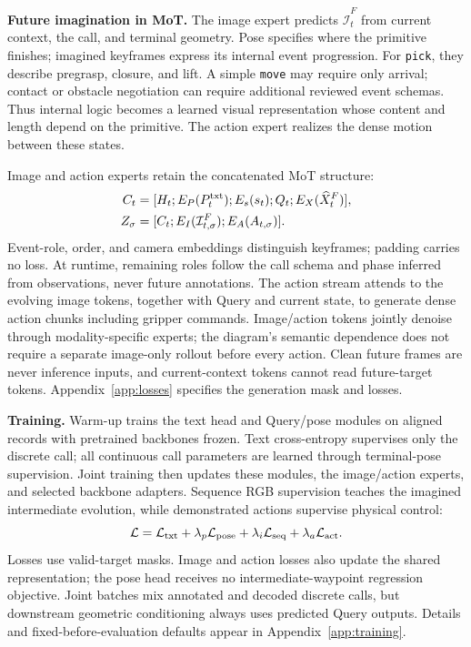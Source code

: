 \textbf{Future imagination in MoT.}
\label{sec:mot}
The image expert predicts $\widehat{\mathcal I}_t^F$ from current context, the call, and terminal geometry. Pose specifies where the primitive finishes; imagined keyframes express its internal event progression. For \texttt{pick}, they describe pregrasp, closure, and lift. A simple \texttt{move} may require only arrival; contact or obstacle negotiation can require additional reviewed event schemas. Thus internal logic becomes a learned visual representation whose content and length depend on the primitive. The action expert realizes the dense motion between these states.

Image and action experts retain the concatenated MoT structure:
\begin{equation}
\begin{aligned}
C_t&=[H_t;E_P(P_t^{\rm txt});E_s(s_t);Q_t;E_X(\widehat X_t^F)],\\
Z_\sigma&=[C_t;E_I(\mathcal I_{t,\sigma}^F);E_A(A_{t,\sigma})].
\end{aligned}
\label{eq:motconcat}
\end{equation}
Event-role, order, and camera embeddings distinguish keyframes; padding carries no loss. At runtime, remaining roles follow the call schema and phase inferred from observations, never future annotations. The action stream attends to the evolving image tokens, together with Query and current state, to generate dense action chunks including gripper commands. Image/action tokens jointly denoise through modality-specific experts; the diagram's semantic dependence does not require a separate image-only rollout before every action. Clean future frames are never inference inputs, and current-context tokens cannot read future-target tokens. Appendix~\ref{app:losses} specifies the generation mask and losses.

\textbf{Training.} Warm-up trains the text head and Query/pose modules on aligned records with pretrained backbones frozen. Text cross-entropy supervises only the discrete call; all continuous call parameters are learned through terminal-pose supervision. Joint training then updates these modules, the image/action experts, and selected backbone adapters. Sequence RGB supervision teaches the imagined intermediate evolution, while demonstrated actions supervise physical control:
\begin{equation}
\mathcal L=\mathcal L_{\rm txt}+\lambda_p\mathcal L_{\rm pose}
+\lambda_i\mathcal L_{\rm seq}+\lambda_a\mathcal L_{\rm act}.
\label{eq:training}
\end{equation}
Losses use valid-target masks. Image and action losses also update the shared representation; the pose head receives no intermediate-waypoint regression objective. Joint batches mix annotated and decoded discrete calls, but downstream geometric conditioning always uses predicted Query outputs. Details and fixed-before-evaluation defaults appear in Appendix~\ref{app:training}.

